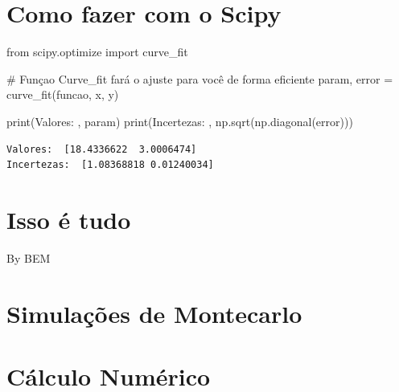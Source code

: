 \documentclass[
  letterpaper,
  DIV=11,
  numbers=noendperiod]{scrreprt}
\newenvironment{Shaded}{\begin{snugshade}}{\end{snugshade}}
\newcommand{\BuiltInTok}[1]{\textcolor[rgb]{0.00,0.23,0.31}{#1}}
\newcommand{\CommentTok}[1]{\textcolor[rgb]{0.37,0.37,0.37}{#1}}
\newcommand{\ImportTok}[1]{\textcolor[rgb]{0.00,0.46,0.62}{#1}}
\newcommand{\NormalTok}[1]{\textcolor[rgb]{0.00,0.23,0.31}{#1}}
\newcommand{\OperatorTok}[1]{\textcolor[rgb]{0.37,0.37,0.37}{#1}}
\newcommand{\StringTok}[1]{\textcolor[rgb]{0.13,0.47,0.30}{#1}}
\begin{document}
\chapter{Como fazer com o Scipy}\label{como-fazer-com-o-scipy-1}

\begin{Shaded}
\begin{Highlighting}[]
\ImportTok{from}\NormalTok{ scipy.optimize }\ImportTok{import}\NormalTok{ curve\_fit}
\end{Highlighting}
\end{Shaded}

\begin{Shaded}
\begin{Highlighting}[]
\CommentTok{\# Funçao Curve\_fit fará o ajuste para você de forma eficiente}
\NormalTok{param, error }\OperatorTok{=}\NormalTok{ curve\_fit(funcao, x, y)}
\end{Highlighting}
\end{Shaded}

\begin{Shaded}
\begin{Highlighting}[]
\BuiltInTok{print}\NormalTok{(}\StringTok{\textquotesingle{}Valores: \textquotesingle{}}\NormalTok{, param)}
\BuiltInTok{print}\NormalTok{(}\StringTok{\textquotesingle{}Incertezas: \textquotesingle{}}\NormalTok{, np.sqrt(np.diagonal(error)))}
\end{Highlighting}
\end{Shaded}

\begin{verbatim}
Valores:  [18.4336622  3.0006474]
Incertezas:  [1.08368818 0.01240034]
\end{verbatim}

\chapter{Isso é tudo}\label{isso-uxe9-tudo-5}

By BEM

\chapter{Simulações de Montecarlo}\label{simulauxe7uxf5es-de-montecarlo}

\chapter{Cálculo Numérico}\label{cuxe1lculo-numuxe9rico}
\end{document}

